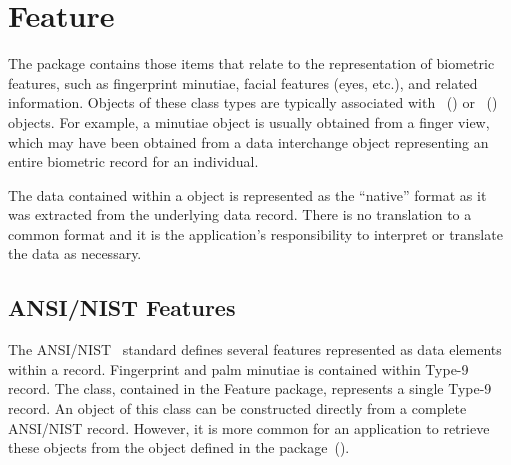 %
%
\chapter{Feature}
\label{chp-feature}
The  package contains those items that relate to the representation of
biometric features, such as fingerprint minutiae, facial features (eyes, etc.),
and related information. Objects of these class types are typically associated
with ~() or
~()
objects. For example, a minutiae object is usually obtained from a finger view,
which may have been obtained from a data interchange object representing an
entire biometric record for an individual.

The data contained within a  object is represented as the ``native''
format as it was extracted from the underlying data record. There is no
translation to a common format and it is the application's responsibility to
interpret or translate the data as necessary.

\section{ANSI/NIST Features}
\label{sec-ansinistfeatures}
The ANSI/NIST~\cite{std:an2k} standard defines several features represented
as data elements within a record. Fingerprint and palm minutiae is contained
within Type-9 record. The  class, contained in the Feature
package, represents a single Type-9 record. An object of this class can be
constructed directly from a complete ANSI/NIST record. However, it is more
common for an application to retrieve these objects from the  object
defined in the  package~().
